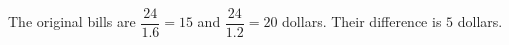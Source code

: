 The original bills are $\dfrac{24}{1.6}=15$ and $\dfrac{24}{1.2}=20$ dollars. Their difference is $\boxed 5$ dollars.
